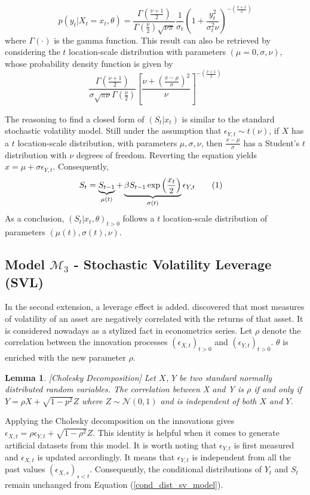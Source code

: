 \documentclass[11pt,a4,twosided,singlespacing,titlepagenumber=on]{scrreprt}
\numberwithin{equation}{chapter} %
\newtheorem{lemma}[theorem]{Lemma}%
\theoremstyle{remark}
\newcommand\numberthis{\addtocounter{equation}{1}\tag{\theequation}}
\begin{document}
\begin{equation}
p(y_t | X_t = x_t, \theta) = \frac{\Gamma(\frac{\nu+1}{2})}{\Gamma(\frac{\nu}{2}) \sqrt{\nu\pi}} \frac{1}{\sigma_t}\left( 1 + \frac{y_t^2}{\sigma_t^2 \nu}\right)^{-\left(\frac{v+1}{2} \right)}
\end{equation}
where $\Gamma(\cdot)$ is the gamma function. This result can also be retrieved by considering the $t$ location-scale distribution with parameters $(\mu = 0, \sigma, \nu)$, whose probability density function is given by
\begin{equation}
\frac{\Gamma \left(\frac{\nu+1}{2} \right)}{\sigma \sqrt{\pi \nu} \Gamma \left(\frac{\nu}{2} \right)} \left[ \frac{\nu + \left( \frac{x-\mu}{\sigma}\right)^2}{\nu}\right]^{-\left(\frac{\nu+1}{2} \right)}
\end{equation}


The reasoning to find a closed form of $(S_t | x_t)$ is similar to the standard stochastic volatility model. Still under the assumption that $\epsilon_{Y,t} \sim t(\nu)$, if $X$ has a $t$ location-scale distribution, with parameters $\mu, \sigma, \nu$, then $\frac{x-\mu}{\sigma}$ has a Student's $t$ distribution with $\nu$ degrees of freedom. Reverting the equation yields $x = \mu + \sigma \epsilon_{Y,t}$. Consequently,
\begin{align*}
S_t  &= \underbrace{S_{t-1}}_{\mu(t)} + \underbrace{\beta S_{t-1} \exp \left( \frac{x_t}{2} \right)}_{\sigma(t)} \epsilon_{Y,t} \numberthis
\end{align*}
As a conclusion, $(S_t | x_t, \theta)_{t>0}$ follows a $t$ location-scale distribution of parameters $(\mu(t), \sigma(t), \nu)$.

\subsection{Model $\mathcal{M}_3$ - Stochastic Volatility Leverage (SVL)}
In the second extension, a leverage effect is added. \cite{black1976} discovered that most measures of volatility of an asset are negatively correlated with the returns of that asset. It is considered nowadays as a stylized fact in econometrics series. Let $\rho$ denote the correlation between the innovation processes $(\epsilon_{X,t})_{t>0}$ and $(\epsilon_{Y,t})_{t>0}$. $\theta$ is enriched with the new parameter $\rho$.

\begin{lemma}
\textit{
[Cholesky Decomposition] Let $X$, $Y$ be two standard normally distributed random variables. The correlation between X and Y is $\rho$ if and only if $Y = \rho X + \sqrt{1-p^2} Z$ where $Z \sim \mathcal{N}(0,1)$ and is independent of both $X$ and $Y$.
}
\end{lemma}
Applying the Cholesky decomposition on the innovations gives $\epsilon_{X,t} = \rho \epsilon_{Y,t} + \sqrt{1-\rho^2} Z$. This identity is helpful when it comes to generate artificial datasets from this model. It is worth noting that $\epsilon_{Y,t}$ is first measured and $\epsilon_{X,t}$ is updated accordingly. It means that $\epsilon_{Y,t}$ is independent from all the past values $(\epsilon_{X,s})_{s < t}$. Consequently, the conditional distributions of $Y_t$ and $S_t$ remain unchanged from Equation (\ref{cond_dist_sv_model}).
\end{document}
